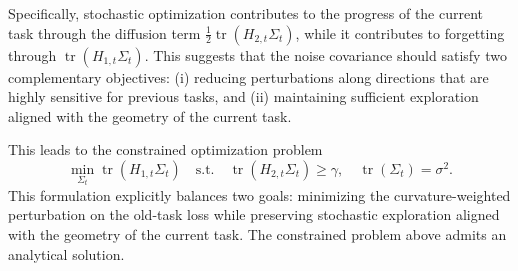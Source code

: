 \documentclass{article}
\begin{document}
Specifically, stochastic optimization contributes to the progress of the current task through the diffusion term $\frac12 \operatorname{tr}(H_{2,t}\Sigma_t)$,
while it contributes to forgetting through $\operatorname{tr}(H_{1,t}\Sigma_t)$.
This suggests that the noise covariance should satisfy two complementary objectives:
(i) reducing perturbations along directions that are highly sensitive for previous tasks, and
(ii) maintaining sufficient exploration aligned with the geometry of the current task.





This leads to the constrained optimization problem
\begin{equation}
\min_{\Sigma_t}
\operatorname{tr}(H_{1,t}\Sigma_t)
\quad
\text{s.t.}
\quad
\operatorname{tr}(H_{2,t}\Sigma_t)\ge\gamma,
\quad
\operatorname{tr}(\Sigma_t)=\sigma^2 .
\label{eq: diffusion target}
\end{equation}
This formulation explicitly balances two goals: minimizing the curvature-weighted perturbation on the old-task loss while preserving stochastic exploration aligned with the geometry of the current task.
The constrained problem above admits an analytical solution.
\end{document}
